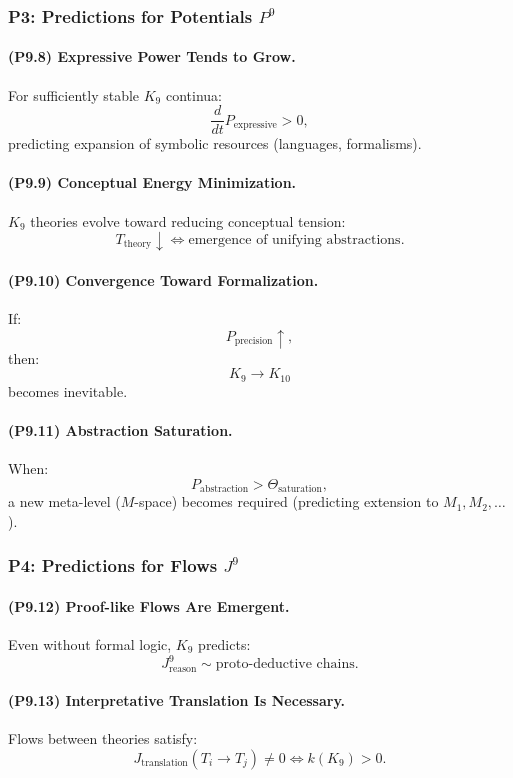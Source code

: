 \subsubsection{P3: Predictions for Potentials \texorpdfstring{$P^9$}{P^9}}

\paragraph{(P9.8) Expressive Power Tends to Grow.}
For sufficiently stable $K_9$ continua:
\[
\frac{d}{dt} P_{\mathrm{expressive}} > 0,
\]
predicting expansion of symbolic resources (languages, formalisms).

\paragraph{(P9.9) Conceptual Energy Minimization.}
$K_9$ theories evolve toward reducing conceptual tension:
\[
T_{\mathrm{theory}} \downarrow 
\iff 
\text{emergence of unifying abstractions}.
\]

\paragraph{(P9.10) Convergence Toward Formalization.}
If:
\[
P_{\mathrm{precision}} \uparrow,
\]
then:
\[
K_9 \to K_{10}
\]
becomes inevitable.

\paragraph{(P9.11) Abstraction Saturation.}
When:
\[
P_{\mathrm{abstraction}} > \Theta_{\mathrm{saturation}},
\]
a new meta-level ($M$-space) becomes required (predicting extension to $M_1, M_2,\ldots$).

\subsubsection{P4: Predictions for Flows \texorpdfstring{$J^9$}{J^9}}

\paragraph{(P9.12) Proof-like Flows Are Emergent.}
Even without formal logic, $K_9$ predicts:
\[
J_{\mathrm{reason}}^9
\sim 
\text{proto-deductive chains}.
\]

\paragraph{(P9.13) Interpretative Translation Is Necessary.}
Flows between theories satisfy:
\[
J_{\mathrm{translation}}(T_i \to T_j) \neq 0 
\iff 
k(K_9) > 0.
\]

